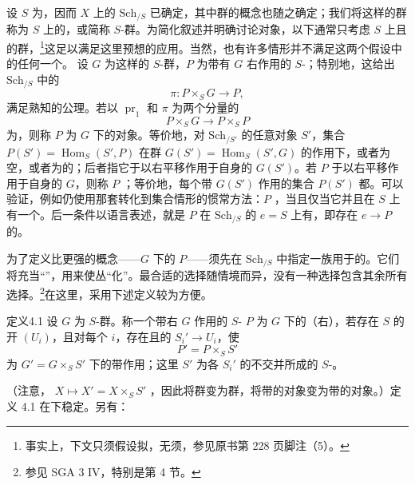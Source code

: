 设 $S$ 为，因而 $X$ 上的 $\mathrm{Sch}_{/S}$ 已确定，其中群的概念也随之确定；我们将这样的群称为 $S$ 上的，或简称 $S$-群。为简化叙述并明确讨论对象，以下通常只考虑 $S$ 上且的群，\footnote{事实上，下文只须假设拟，无须，参见原书第 228 页脚注（5）。}这足以满足这里预想的应用。当然，也有许多情形并不满足这两个假设中的任何一个。
设 $G$ 为这样的 $S$-群，$P$ 为带有 $G$ 右作用的 $S$-；特别地，这给出 $\mathrm{Sch}_{/S}$ 中的
\[
\pi:P\times_SG\longrightarrow P,
\]
满足熟知的公理。若以 $\operatorname{pr}_1$ 和 $\pi$ 为两个分量的
\[
P\times_SG\longrightarrow P\times_SP
\]
为，则称 $P$ 为 $G$ 下的对象。等价地，对 $\mathrm{Sch}_{/S'}$ 的任意对象 $S'$，集合 $P(S')=\operatorname{Hom}_S(S',P)$ 在群 $G(S')=\operatorname{Hom}_S(S',G)$ 的作用下，或者为空，或者为的；后者指它于以右平移作用于自身的 $G(S')$。若 $P$ 于以右平移作用于自身的 $G$，则称 $P$ ；等价地，每个带 $G(S')$ 作用的集合 $P(S')$ 都。可以验证，例如仍使用那套转化到集合情形的惯常方法：$P$ ，当且仅当它并且在 $S$ 上有一个。后一条件以语言表述，就是 $P$ 在 $\mathrm{Sch}_{/S}$ 的 $e=S$ 上有，即存在 $e\to P$ 的。

为了定义比更强的概念——$G$ 下的 $P$——须先在 $\mathrm{Sch}_{/S}$ 中指定一族用于的。它们将充当“”，用来使丛“化”。最合适的选择随情境而异，没有一种选择包含其余所有选择。\footnote{参见 SGA 3 IV，特别是第 4 节。}在这里，采用下述定义较为方便。

\begin{SGAresult}{定义}{4.1}
设 $G$ 为 $S$-群。称一个带右 $G$ 作用的 $S$- $P$ 为 $G$ 下的（右），若存在 $S$ 的开 $(U_i)$，且对每个 $i$，存在且的 $S_i'\to U_i$，使
\[
P'=P\times_SS'
\]
为 $G'=G\times_SS'$ 下的带作用；这里 $S'$ 为各 $S_i'$ 的不交并所成的 $S$-。
\end{SGAresult}
（注意， $X\mapsto X'=X\times_SS'$ ，因此将群变为群，将带的对象变为带的对象。）定义 4.1 在下稳定。另有：

